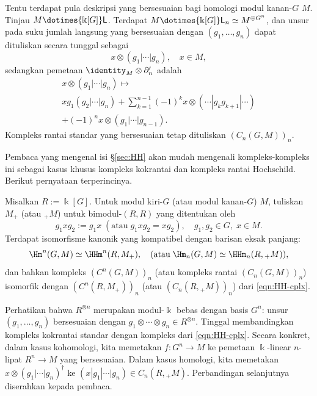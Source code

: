 Tentu terdapat pula deskripsi yang bersesuaian bagi homologi modul kanan-$G$
$M$. Tinjau $M\dotimes{\Bbbk[G]}\mathsf{L}$. Terdapat
$M\dotimes{\Bbbk[G]}\mathsf{L}_n\simeq M^{\oplus G^n}$, dan unsur pada suku
jumlah langsung yang bersesuaian dengan $(g_1,\ldots,g_n)$ dapat dituliskan
secara tunggal sebagai
\[ x \otimes (g_1 | \cdots | g_n), \quad x \in M, \]
sedangkan pemetaan $\identity_M\otimes\partial'_n$ adalah
\begin{multline*}
	x \otimes (g_1 | \cdots | g_n) \mapsto \\
	x g_1 (g_2 | \cdots | g_n) + \sum_{k=1}^{n-1} (-1)^k x \otimes (\cdots | g_k g_{k+1} | \cdots) \\
	+ (-1)^n x \otimes (g_1 | \cdots | g_{n-1}).
\end{multline*}
Kompleks rantai standar yang bersesuaian tetap dituliskan $(C_n(G,M))_n$.

Pembaca yang mengenal isi \S\ref{sec:HH} akan mudah mengenali
kompleks-kompleks ini sebagai kasus khusus kompleks kokrantai dan kompleks
rantai Hochschild. Berikut pernyataan terperincinya.

\begin{proposisi}
	Misalkan $R:=\Bbbk[G]$. Untuk modul kiri-$G$ (atau modul kanan-$G$) $M$,
	tuliskan $M_+$ (atau ${}_+M$) untuk bimodul-$(R,R)$ yang ditentukan oleh
	\[ g_1 x g_2 := g_1 x \; (\text{atau}\; g_1 x g_2 = x g_2 ), \quad g_1 , g_2 \in G, \; x \in M. \]
	Terdapat isomorfisme kanonik yang kompatibel dengan barisan eksak panjang:
	\[ \Hm^n(G, M) \simeq \HHm^n(R, M_+), \quad (\text{atau}\; \Hm_n(G, M) \simeq \HHm_n(R, {}_+ M)), \]
	dan bahkan kompleks $(C^n(G,M))_n$ (atau kompleks rantai
	$(C_n(G,M))_n$) isomorfik dengan $(C^n(R,M_+))_n$ (atau
	$(C_n(R,{}_+M))_n$) dari \eqref{eqn:HH-cplx}.
\end{proposisi}
\begin{bukti}
	Perhatikan bahwa $R^{\otimes n}$ merupakan modul-$\Bbbk$ bebas dengan
	basis $G^n$: unsur $(g_1,\ldots,g_n)$ bersesuaian dengan
	$g_1\otimes\cdots\otimes g_n\in R^{\otimes n}$. Tinggal membandingkan
	kompleks kokrantai standar dengan kompleks dari \eqref{eqn:HH-cplx}.
	Secara konkret, dalam kasus kohomologi, kita memetakan $f:G^n\to M$ ke
	pemetaan $\Bbbk$-linear $n$-lipat $R^n\to M$ yang bersesuaian. Dalam
	kasus homologi, kita memetakan
	$x\otimes(g_1|\cdots|g_n)^\dagger$ ke
	$(x|g_1|\cdots|g_n)\in C_n(R,{}_+M)$. Perbandingan selanjutnya diserahkan
	kepada pembaca.
\end{bukti}

